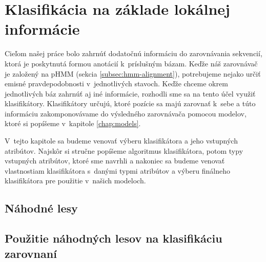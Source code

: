 \chapter[Klasifikácia]{Klasifikácia na základe lokálnej informácie}
\label{chap:clf}

Cieľom našej práce bolo zahrnúť dodatočnú informáciu do zarovnávania sekvencií, ktorá je poskytnutá formou anotácií k~príslušným bázam. Keďže náš zarovnávač je založený na pHMM (sekcia \ref{subsec:hmm-alignment}), potrebujeme nejako určiť emisné pravdepodobnosti v~jednotlivých stavoch. Keďže chceme okrem jednotlivých báz zahrnúť aj iné informácie, rozhodli sme sa na tento účel využiť klasifikátory. Klasifikátory určujú, ktoré pozície sa majú zarovnať k~sebe a túto informáciu zakomponovávame do výsledného zarovnávača pomocou modelov, ktoré si popíšeme v~kapitole \ref{chap:models}.

V~tejto kapitole sa budeme venovať výberu klasifikátora a jeho vstupných atribútov. Najskôr si stručne popíšeme algoritmus klasifikátora, potom typy vstupných atribútov, ktoré sme navrhli a nakoniec sa budeme venovať vlastnostiam klasifikátora s~danými typmi atribútov a výberu finálneho klasifikátora pre použitie v~našich modeloch.

\section{Náhodné lesy}


\section[Použitie náh. lesov v~zarovnaní]{Použitie náhodných lesov na klasifikáciu zarovnaní}
\label{sec:use-rf-alignment}

